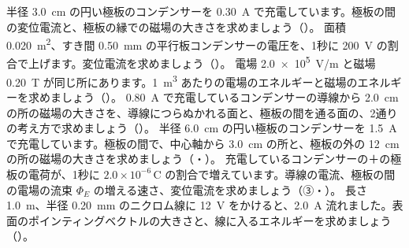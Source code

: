 \bkendproblems
{}
\bkproblem 半径 \qty{3.0}{cm} の円い極板のコンデンサーを \qty{0.30}{A} で充電しています。極板の間の変位電流と、極板の縁での磁場の大きさを求めましょう（\nobreak{}\nobreak）。
\bkproblem 面積 \qty{0.020}{m^2}、すき間 \qty{0.50}{mm} の平行板コンデンサーの電圧を、1秒に \qty{200}{V} の割合で上げます。変位電流を求めましょう（\nobreak{}\nobreak）。
\bkproblem 電場 \qty{2.0e5}{V/m} と磁場 \qty{0.20}{T} が同じ所にあります。\qty{1}{m^3} あたりの電場のエネルギーと磁場のエネルギーを求めましょう（\nobreak{}\nobreak）。
\bkproblem \qty{0.80}{A} で充電しているコンデンサーの導線から \qty{2.0}{cm} の所の磁場の大きさを、導線につらぬかれる面と、極板の間を通る面の、2通りの考え方で求めましょう（\nobreak{}\nobreak）。
\bkproblem 半径 \qty{6.0}{cm} の円い極板のコンデンサーを \qty{1.5}{A} で充電しています。極板の間で、中心軸から \qty{3.0}{cm} の所と、極板の外の \qty{12}{cm} の所の磁場の大きさを求めましょう（\nobreak{}\nobreak・\nobreak{}\nobreak）。
\bkproblem 充電しているコンデンサーの＋の極板の電荷が、1秒に $2.0\times10^{-6}$\,C の割合で増えています。導線の電流、極板の間の電場の流束 $\Phi_E$ の増える速さ、変位電流を求めましょう（③・\nobreak{}\nobreak）。
\bkproblem 長さ \qty{1.0}{m}、半径 \qty{0.20}{mm} のニクロム線に \qty{12}{V} をかけると、\qty{2.0}{A} 流れました。表面のポインティングベクトルの大きさと、線に入るエネルギーを求めましょう（\nobreak{}\nobreak）。
